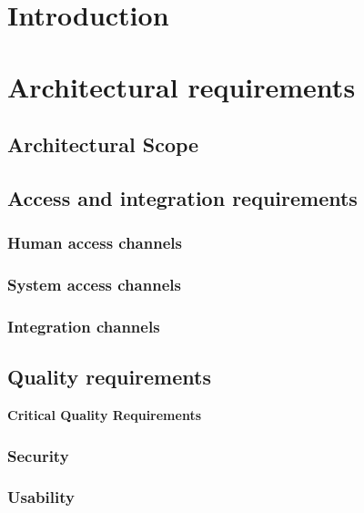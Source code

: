 \documentclass[a4paper,12pt,titlepage]{article}
\begin{document}


\tableofcontents
\newpage

\section{Introduction}

\section{Architectural requirements}
	\subsection{Architectural Scope} %
	
	\newpage
	
	\subsection{Access and integration requirements}
			\subsubsection{Human access channels}	
				
			\subsubsection{System access channels}
					
			\subsubsection{Integration channels}
				
 	\subsection{Quality requirements}
 	
		\textbf{\LARGE Critical Quality Requirements}
		\subsubsection{Security}
			
			
		\subsubsection{Usability}
			
			
\end{document}
